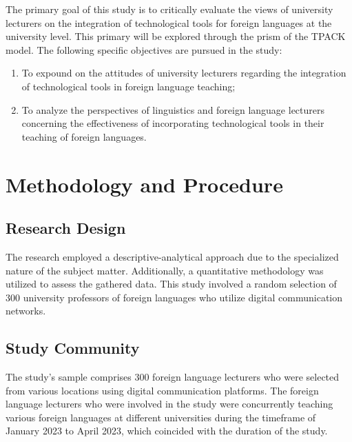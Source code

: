 \documentclass[english]{textolivre}
\begin{document}
    The primary goal of this study is to critically evaluate the views of university lecturers on the integration of technological tools for foreign languages at the university level. This primary will be explored through the prism of the TPACK model. The following specific objectives are pursued in the study:
    \begin{enumerate}[label={\roman*.}]
    \item To expound on the attitudes of university lecturers regarding the integration of technological tools in foreign language teaching;
    \item To analyze the perspectives of linguistics and foreign language lecturers concerning the effectiveness of incorporating technological tools in their teaching of foreign languages.
    \end{enumerate}








\section{Methodology and Procedure}

\subsection{Research Design}

    The research employed a descriptive-analytical approach due to the specialized nature of the subject matter. Additionally, a quantitative methodology was utilized to assess the gathered data. This study involved a random selection of 300 university professors of foreign languages who utilize digital communication networks.

\subsection{Study Community}

    The study’s sample comprises 300 foreign language lecturers who were selected from various locations using digital communication platforms. The foreign language lecturers who were involved in the study were concurrently teaching various foreign languages at different universities during the timeframe of January 2023 to April 2023, which coincided with the duration of the study.
\end{document}
